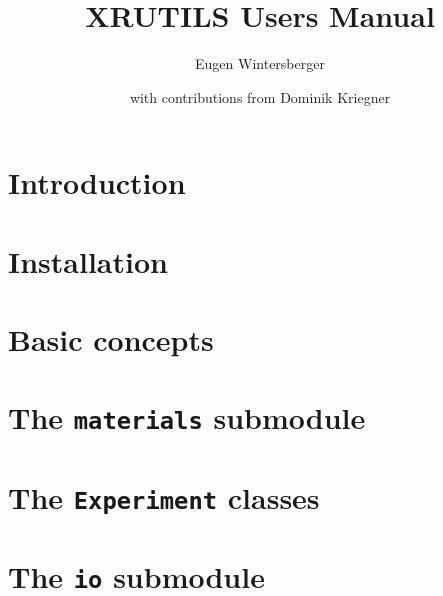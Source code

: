 \documentclass[a4paper]{book}
\title{{\Huge XRUTILS Users Manual}}
\author{Eugen Wintersberger \and with contributions from Dominik Kriegner}
\begin{document}
\maketitle
\tableofcontents

\chapter{Introduction}


\chapter{Installation}


\chapter{Basic concepts}


\chapter[The materials submodule]{The {\tt materials} submodule}


\chapter[The Experiment classes]{The {\tt Experiment} classes}


\chapter[The io submodule]{The {\tt io} submodule}


%
\end{document}
